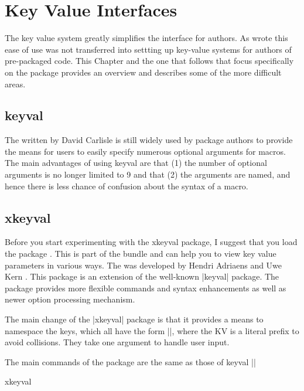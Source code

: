 \chapter{Key Value Interfaces}

The key value system greatly simplifies the \tex interface for authors. As \citep{joseph2009} wrote this ease of use was not transferred into settting up key-value systems for authors of pre-packaged \tex code. This Chapter and the one that follows that focus specifically on the  package provides an overview and describes some of the more difficult areas. 

\section{keyval}

The  written by David Carlisle is still widely used by package authors to provide the means for users to easily specify numerous optional arguments for macros. The main advantages of using keyval are that  (1) the number of optional arguments is no longer limited to 9 and that (2) the arguments are named, and hence there is less chance of confusion about the syntax of a macro.

\section{xkeyval}

Before you start experimenting with the xkeyval package, I suggest that you load the package . This is part of the   bundle and can help you to view key value parameters in various ways. The  was developed by Hendri Adriaens and Uwe Kern \citep{xkeyval}. This package is an extension of the well-known |keyval| package. The package provides more flexible commands and syntax enhancements as well as newer option processing mechanism.

The main change of the |xkeyval| package is that it provides a means to namespace the keys, which all have the form |\KV@family@keyname|, where the KV is a literal prefix to avoid collisions. They take one argument to handle user input.

The main commands of the package are the same as those of keyval ||



\begin{texexample}{xkeyval }{}
\makeatletter


\makeatother

\lorem

\lorem
\end{texexample}

